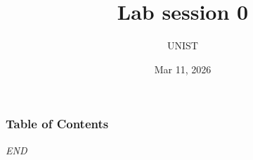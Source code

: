 \documentclass[aspectratio=169,10pt]{beamer}
\title[Introduction to AIP2] %
{Lab session 0}
\author{UNIST}
\institute[UNIST] %
{
  Ulsan National Institute of Science and Technology
}
\date %
{Mar 11, 2026}
\begin{document}
\frame{\titlepage}


\begin{frame}
\frametitle{Table of Contents}
\tableofcontents
\end{frame}










\begin{frame}{}
    \centering \Large
    \emph{END}
\end{frame}
  
\end{document}
